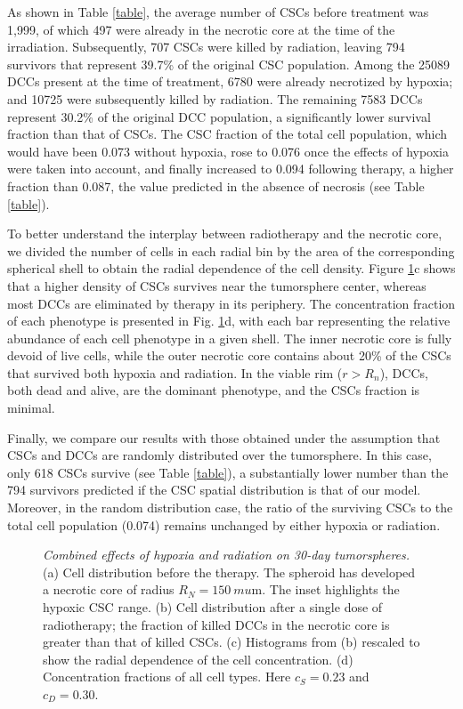\documentclass[10pt,letterpaper]{article}
\begin{document}
As shown in Table \ref{table}, the average number of CSCs before treatment was 1,999, of which 497 were already in the necrotic core at the time of the irradiation. Subsequently, 707 CSCs were killed by radiation, leaving 794 survivors that represent 39.7\% of the original CSC population. Among the 25089 DCCs present at the time of treatment, 6780 were already necrotized by hypoxia; and 10725 were subsequently killed by radiation. The remaining 7583 DCCs represent 30.2\% of the original DCC population, a significantly lower survival fraction than that of CSCs. The CSC fraction of the total cell population, which would have been 0.073 without hypoxia, rose to 0.076 once the effects of hypoxia were taken into account, and finally increased to 0.094 following therapy, a higher fraction than 0.087, the value predicted in the absence of necrosis (see Table \ref{table}).


To better understand the interplay between radiotherapy and the necrotic core, we divided the number of cells in each radial bin by the area of the corresponding spherical shell to obtain the radial dependence of the cell density. Figure \ref{fig:necrotic}c shows that a higher density of CSCs survives near the tumorsphere center, whereas most DCCs are eliminated by therapy in its periphery. The concentration fraction of each phenotype is presented in Fig. \ref{fig:necrotic}d, with each bar representing the relative abundance of each cell phenotype in a given shell. The inner necrotic core is fully devoid of live cells, while the outer necrotic core contains about 20\% of the CSCs that survived both hypoxia and radiation. In the viable rim ($r > R_n$), DCCs, both dead and alive, are the dominant phenotype, and the CSCs fraction is minimal.

Finally, we compare our results with those obtained under the assumption that CSCs and DCCs are randomly distributed over the tumorsphere. In this case, only 618 CSCs survive (see Table \ref{table}), a substantially lower number than the 794 survivors predicted if the CSC spatial distribution is that of our model. Moreover, in the random distribution case, the ratio of the surviving CSCs to the total cell population (0.074) remains unchanged by either hypoxia or radiation.



\begin{figure}
	\centering
	\caption{\emph{Combined effects of hypoxia and radiation on 30-day tumorspheres.} (a) Cell distribution before the therapy. The spheroid has developed a necrotic core of radius $ R_N = 150 \ mu$m. The inset highlights the hypoxic CSC range. (b) Cell distribution after a single dose of radiotherapy; the fraction of killed DCCs in the necrotic core is greater than that of killed CSCs. (c) Histograms from (b) rescaled to show the radial dependence of the cell concentration. (d) Concentration fractions of all cell types. Here $c_S=0.23$ and $c_D=0.30$.}
	\label{fig:necrotic}
\end{figure}
\end{document}
